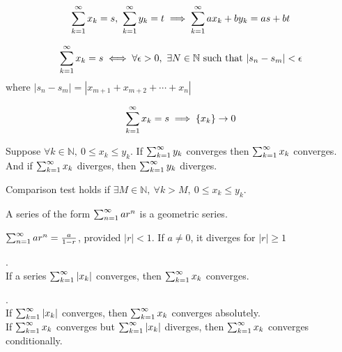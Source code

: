 	\begin{theorem}
		$$\series{x_k}{k} = s,\ \series{y_k}{k} = t \implies \series{ax_k+by_k}{k} = as+bt$$
	\end{theorem}

	\begin{theorem}
		$$\series{x_k}{k} = s \iff \forall \epsilon > 0,\ \exists N \in \mathbb{N} \text{ such that } |s_n-s_m| < \epsilon$$
		where $|s_n - s_m| = |x_{m+1}+x_{m+2}+\cdots+x_n|$
	\end{theorem}

	\begin{theorem}
		$$\series{x_k}{k} = s \implies \sequence{x_k} \to 0$$
	\end{theorem}

	\begin{theorem}
		Suppose $\forall k \in \mathbb{N},\ 0 \le x_k \le y_k$. If $\series{y_k}{k}$ converges then $\series{x_k}{k}$ converges. And if $\series{x_k}{k}$ diverges, then $\series{y_k}{k}$ diverges.
	\end{theorem}

	\begin{remark}
		Comparison test holds if $\exists M \in \mathbb{N},\ \forall k > M,\ 0 \le x_k \le y_k$.
	\end{remark}

	\begin{definition}
		A series of the form $\series{ar^n}{n}$ is a geometric series.
	\end{definition}

	\begin{remark}
		$\series{ar^n}{n} = \frac{a}{1-r}$, provided $|r| < 1$. If $a \ne 0$, it diverges for $|r| \ge 1$ 
	\end{remark}

	\begin{theorem}.\\
		If a series $\series{|x_k|}{k}$ converges, then $\series{x_k}{k}$ converges.
	\end{theorem}

	\begin{definition}.\\
		If $\series{|x_k|}{k}$ converges, then $\series{x_k}{k}$ converges absolutely.\\
		If $\series{x_k}{k}$ converges but $\series{|x_k|}{k}$ diverges, then $\series{x_k}{k}$ converges conditionally.
	\end{definition}

